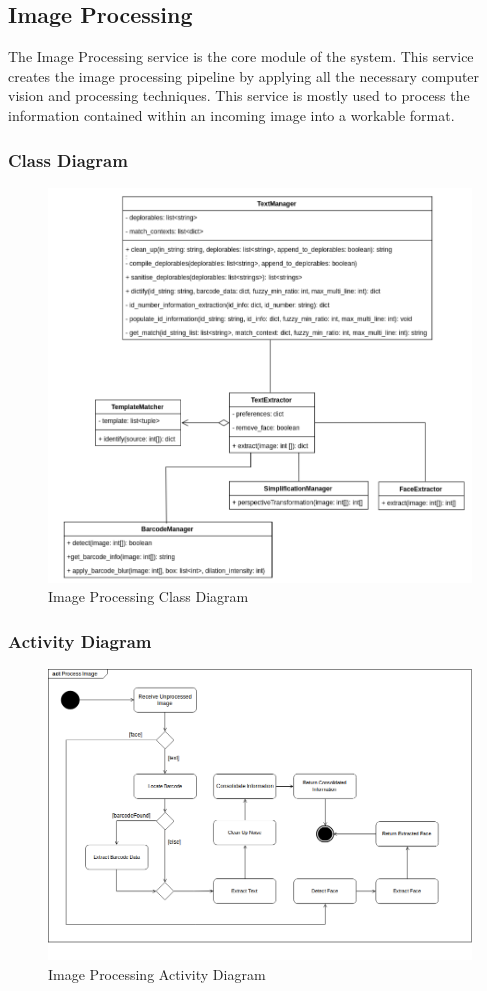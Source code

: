\documentclass{article}
\begin{document}
\subsection{Image Processing}
The Image Processing service is the core module of the system. This service creates the image processing pipeline by applying all the necessary computer vision and processing techniques. This service is mostly used to process the information contained within an incoming image into a workable format. 
\subsubsection{Class Diagram}
	\begin{figure}[H]
	    \centering
	    \includegraphics[scale=0.5]{img/extractClassDiagram.png}
	    \caption{Image Processing Class Diagram}
	 \end{figure}
	 \pagebreak
\subsubsection{Activity Diagram}
	\begin{figure}[H]
	    \centering
	    \includegraphics[scale=0.5]{img/process_activity.png}
	    \caption{Image Processing Activity Diagram}
	 \end{figure}
	 \pagebreak
\end{document}
